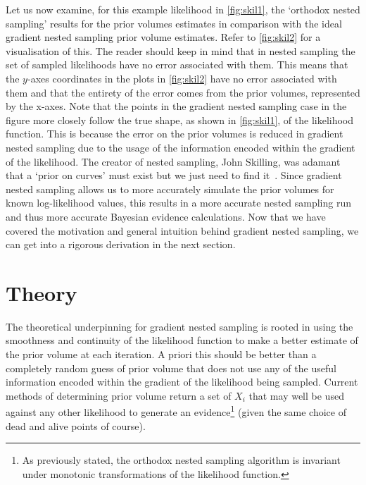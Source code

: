 Let us now examine, for this example likelihood in \cref{fig:skil1}, the `orthodox nested sampling' results for the prior volumes estimates in comparison with the ideal gradient nested sampling prior volume estimates. Refer to \cref{fig:skil2} for a visualisation of this. The reader should keep in mind that in nested sampling the set of sampled likelihoods have no error associated with them. This means that the $y$-axes coordinates in the plots in \cref{fig:skil2} have no error associated with them and that the entirety of the error comes from the prior volumes, represented by the x-axes. Note that the points in the gradient nested sampling case in the figure more closely follow the true shape, as shown in \cref{fig:skil1}, of the likelihood function. This is because the error on the prior volumes is reduced in gradient nested sampling due to the usage of the information encoded within the gradient of the likelihood. The creator of nested sampling, John Skilling, was adamant that a `prior on curves' must exist but we just need to find it~\cite{paris2022}. Since gradient nested sampling allows us to more accurately simulate the prior volumes for known log-likelihood values, this results in a more accurate nested sampling run and thus more accurate Bayesian evidence calculations. Now that we have covered the motivation and general intuition behind gradient nested sampling, we can get into a rigorous derivation in the next section.




\section{\label{sec:level2}Theory}\label{sec:theorygrad}

The theoretical underpinning for gradient nested sampling is rooted in using the smoothness and continuity of the likelihood function to make a better estimate of the prior volume at each iteration. A priori this should be better than a completely random guess of prior volume that does not use any of the useful information encoded within the gradient of the likelihood being sampled. Current methods of determining prior volume return a set of $X_i$ that may well be used against any other likelihood to generate an evidence\footnote{As previously stated, the orthodox nested sampling algorithm is invariant under monotonic transformations of the likelihood function.} (given the same choice of dead and alive points of course). 

